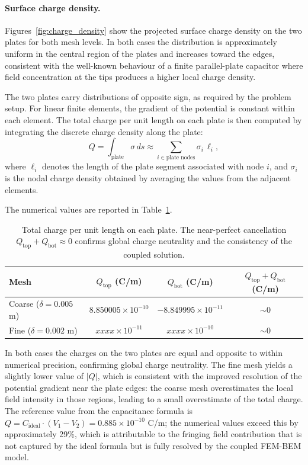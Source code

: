 \documentclass[11pt,onecolumn]{article}
\begin{document}
{\color{cyan}
\paragraph{Surface charge density.}
Figures~\ref{fig:charge_density} show the projected surface charge density on the two 
plates for both mesh levels. In both cases the distribution is approximately uniform in 
the central region of the plates and increases toward the edges, consistent with the 
well-known behaviour of a finite parallel-plate capacitor where field concentration at 
the tips produces a higher local charge density.

The two plates carry distributions of opposite sign, as required by the problem setup. 
For linear finite elements, the gradient of the potential is constant within each element. The total charge per unit length on 
each plate is then computed by integrating the discrete charge density along the plate:
\begin{equation}
Q = \int_{\text{plate}} \sigma\, ds 
\approx 
\sum_{i \in \text{plate nodes}} \sigma_i\, \ell_i ,
\end{equation}
where $\ell_i$ denotes the length of the plate segment associated with node $i$, and 
$\sigma_i$ is the nodal charge density obtained by averaging the values from the 
adjacent elements.} The numerical values are reported in 
Table~\ref{tab:charge}. 

\begin{table}[h!]
    \centering
    \begin{tabular}{lccc}
        \hline
        Mesh & $Q_{\text{top}}$ (C/m) & $Q_{\text{bot}}$ (C/m) & 
        $Q_{\text{top}} + Q_{\text{bot}}$ (C/m) \\
        \hline
        Coarse ($\delta = 0.005$ m) & $8.850005 \times 10^{-10}$ & $-8.849995 \times 10^{-11}$ & $\sim 0$ \\
        Fine ($\delta = 0.002$ m)   & $xxxx \times 10^{-11}$ & $xxxx \times 10^{-10}$ & $\sim 0$ \\
        \hline
    \end{tabular}
    \caption{Total charge per unit length on each plate. The near-perfect cancellation 
    $Q_{\text{top}} + Q_{\text{bot}} \approx 0$ confirms global charge neutrality and 
    the consistency of the coupled solution.}
    \label{tab:charge}
\end{table}

In both cases the charges on the two plates are equal and opposite to within numerical 
precision, confirming global charge neutrality. The fine mesh yields a slightly lower 
value of $|Q|$, which is consistent with the improved resolution of the potential 
gradient near the plate edges: the coarse mesh overestimates the local field intensity 
in those regions, leading to a small overestimate of the total charge. The reference 
value from the capacitance formula is $Q = C_{\text{ideal}} \cdot (V_1 - V_2) = 
0.885 \times 10^{-10}$ C/m; the numerical values exceed this by approximately 29\%, 
which is attributable to the fringing field contribution that is not captured by the 
ideal formula but is fully resolved by the coupled FEM-BEM model.
\end{document}

